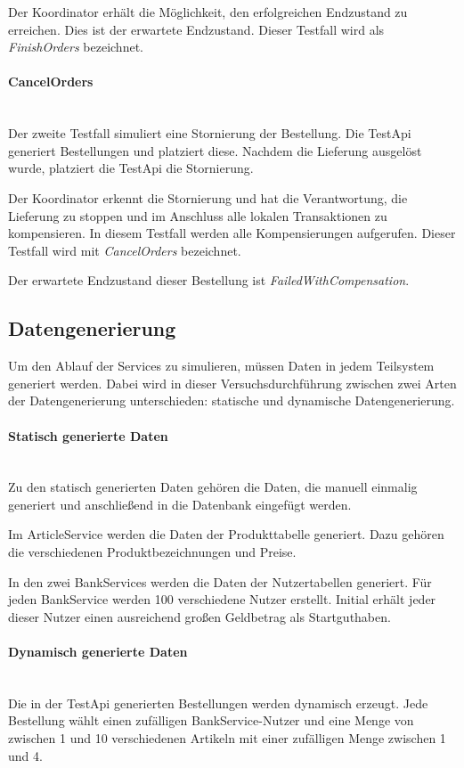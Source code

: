 Der Koordinator erhält die Möglichkeit, den erfolgreichen Endzustand zu erreichen. Dies ist der erwartete Endzustand. Dieser Testfall wird als \textit{FinishOrders} bezeichnet. 

\paragraph*{CancelOrders} \mbox{}\\
Der zweite Testfall simuliert eine Stornierung der Bestellung. Die TestApi generiert Bestellungen und platziert diese. Nachdem die Lieferung ausgelöst wurde, platziert die TestApi die Stornierung. 

Der Koordinator erkennt die Stornierung und hat die Verantwortung, die Lieferung zu stoppen und im Anschluss alle lokalen Transaktionen zu kompensieren. In diesem Testfall werden alle Kompensierungen aufgerufen. Dieser Testfall wird mit \textit{CancelOrders} bezeichnet. 

Der erwartete Endzustand dieser Bestellung ist \textit{FailedWithCompensation}.
\subsection{Datengenerierung}
Um den Ablauf der Services zu simulieren, müssen Daten in jedem Teilsystem generiert werden. Dabei wird in dieser Versuchsdurchführung zwischen zwei Arten der Datengenerierung unterschieden: statische und dynamische Datengenerierung.

\paragraph*{Statisch generierte Daten} \mbox{}\\
Zu den statisch generierten Daten gehören die Daten, die manuell einmalig generiert und anschließend in die Datenbank eingefügt werden.

Im ArticleService werden die Daten der Produkttabelle generiert. Dazu gehören die verschiedenen Produktbezeichnungen und Preise.

In den zwei BankServices werden die Daten der Nutzertabellen generiert. Für jeden BankService werden 100 verschiedene Nutzer erstellt. Initial erhält jeder dieser Nutzer einen ausreichend großen Geldbetrag als Startguthaben. 

\paragraph*{Dynamisch generierte Daten} \mbox{}\\
Die in der TestApi generierten Bestellungen werden dynamisch erzeugt. Jede Bestellung wählt einen zufälligen BankService-Nutzer und eine Menge von zwischen 1 und 10 verschiedenen Artikeln mit einer zufälligen Menge zwischen 1 und 4.

